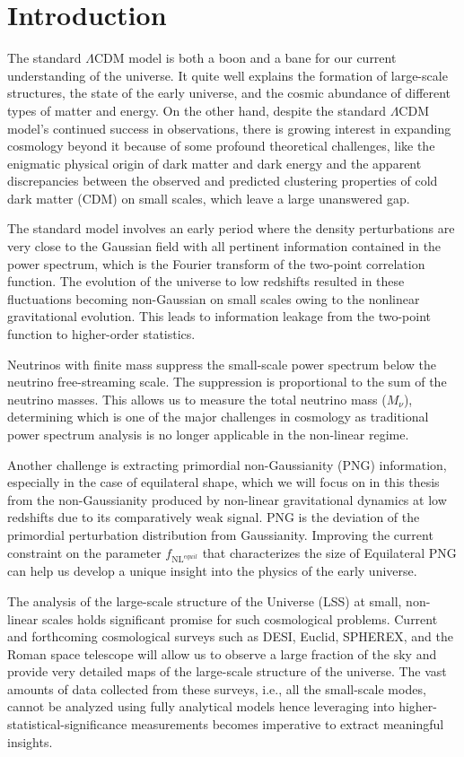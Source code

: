 \chapter{Introduction}

The standard $\Lambda$CDM model is both a boon and a bane for our current understanding of the universe. It quite well explains the formation of large-scale structures, the state of the early universe, and the cosmic abundance of different types of matter and energy. On the other hand, despite the standard $\Lambda$CDM model's continued success in observations, there is growing interest in expanding cosmology beyond it because of some profound theoretical challenges, like the enigmatic physical origin of dark matter and dark energy and the apparent discrepancies between the observed and predicted clustering properties of cold dark matter (CDM) on small scales, which leave a large unanswered gap.

The standard model involves an early period where the density perturbations are very close to the Gaussian field with all pertinent information contained in the power spectrum, which is the Fourier transform of the two-point correlation function. The evolution of the universe to low redshifts resulted in these fluctuations becoming non-Gaussian on small scales owing to the nonlinear gravitational evolution. This leads to information leakage from the two-point function to higher-order statistics.

Neutrinos with finite mass suppress the small-scale power spectrum below the neutrino free-streaming scale. The suppression is proportional to the sum of the neutrino masses. This allows us to measure the total neutrino mass ($M_\nu$), determining which is one of the major challenges in cosmology as traditional power spectrum analysis is no longer applicable in the non-linear regime.

Another challenge is extracting primordial non-Gaussianity (PNG) information, especially in the case of equilateral shape, which we will focus on in this thesis from the non-Gaussianity produced by non-linear gravitational dynamics at low redshifts due to its comparatively weak signal. PNG is the deviation of the primordial perturbation distribution from Gaussianity. Improving the current constraint on the parameter $f_{\mathrm{NL}^{equil}}$ that characterizes the size of Equilateral PNG can help us develop a unique insight into the physics of the early universe.

The analysis of the large-scale structure of the Universe (LSS) at small, non-linear scales holds significant promise for such cosmological problems. Current and forthcoming cosmological surveys such as DESI, Euclid, SPHEREX, and the Roman space telescope will allow us to observe a large fraction of the sky and provide very detailed maps of the large-scale structure of the universe. The vast amounts of data collected from these surveys, i.e., all the small-scale modes, cannot be analyzed using fully analytical models hence leveraging into higher-statistical-significance measurements becomes imperative to extract meaningful insights.


